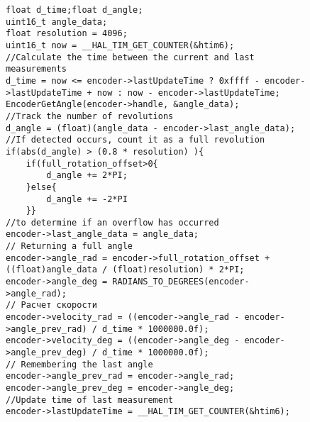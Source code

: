 \begin{figure}[H]
	\centering
	\begin{verbatim}
float d_time;float d_angle;
uint16_t angle_data;
float resolution = 4096;
uint16_t now = __HAL_TIM_GET_COUNTER(&htim6);
//Calculate the time between the current and last measurements
d_time = now <= encoder->lastUpdateTime ? 0xffff - encoder->lastUpdateTime + now : now - encoder->lastUpdateTime;
EncoderGetAngle(encoder->handle, &angle_data);
//Track the number of revolutions
d_angle = (float)(angle_data - encoder->last_angle_data);
//If detected occurs, count it as a full revolution
if(abs(d_angle) > (0.8 * resolution) ){
	if(full_rotation_offset>0{
		d_angle += 2*PI;
	}else{
		d_angle += -2*PI
	}}
//to determine if an overflow has occurred
encoder->last_angle_data = angle_data;
// Returning a full angle
encoder->angle_rad = encoder->full_rotation_offset + ((float)angle_data / (float)resolution) * 2*PI;
encoder->angle_deg = RADIANS_TO_DEGREES(encoder->angle_rad);
// Расчет скорости
encoder->velocity_rad = ((encoder->angle_rad - encoder->angle_prev_rad) / d_time * 1000000.0f);
encoder->velocity_deg = ((encoder->angle_deg - encoder->angle_prev_deg) / d_time * 1000000.0f);
// Remembering the last angle
encoder->angle_prev_rad = encoder->angle_rad;
encoder->angle_prev_deg = encoder->angle_deg;
//Update time of last measurement
encoder->lastUpdateTime = __HAL_TIM_GET_COUNTER(&htim6);
	\end{verbatim}

\end{figure}


\newpage
{}


